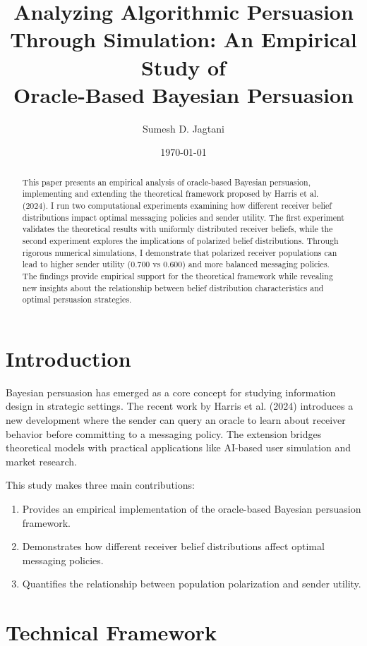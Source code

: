 \documentclass[12pt]{article}
\title{Analyzing Algorithmic Persuasion Through Simulation: An Empirical Study of\\
Oracle-Based Bayesian Persuasion}
\author{Sumesh D. Jagtani}
\date{\today}
\theoremstyle{plain}
\theoremstyle{definition}
\theoremstyle{remark}
\begin{document}
\maketitle

\begin{abstract}
This paper presents an empirical analysis of oracle-based Bayesian persuasion, implementing and extending the theoretical framework proposed by Harris et al. (2024). I run two computational experiments examining how different receiver belief distributions impact optimal messaging policies and sender utility. The first experiment validates the theoretical results with uniformly distributed receiver beliefs, while the second experiment explores the implications of polarized belief distributions. Through rigorous numerical simulations, I demonstrate that polarized receiver populations can lead to higher sender utility (0.700 vs 0.600) and more balanced messaging policies. The findings provide empirical support for the theoretical framework while revealing new insights about the relationship between belief distribution characteristics and optimal persuasion strategies.
\end{abstract}

\section{Introduction}
Bayesian persuasion has emerged as a core concept for studying information design in strategic settings. The recent work by Harris et al. (2024) introduces a new development where the sender can query an oracle to learn about receiver behavior before committing to a messaging policy. The extension bridges theoretical models with practical applications like AI-based user simulation and market research.

This study makes three main contributions:
\begin{enumerate}
    \item Provides an empirical implementation of the oracle-based Bayesian persuasion framework.
    \item Demonstrates how different receiver belief distributions affect optimal messaging policies.
    \item Quantifies the relationship between population polarization and sender utility.
\end{enumerate}

\section{Technical Framework}
\end{document}
